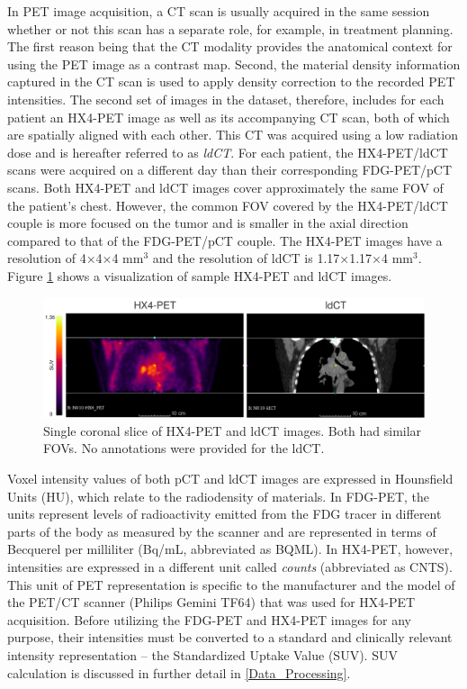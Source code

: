 In PET image acquisition, a CT scan is usually acquired in the same session whether or not this scan has a separate role, for example, in treatment planning. The first reason being that the CT modality provides the anatomical context for using the PET image as a contrast map. Second, the material density information captured in the CT scan is used to apply density correction to the recorded PET intensities. The second set of images in the dataset, therefore, includes for each patient an HX4-PET image as well as its accompanying CT scan, both of which are spatially aligned with each other. This CT was acquired using a low radiation dose and is hereafter referred to as \textit{ldCT}. For each patient, the HX4-PET/ldCT scans were acquired on a different day than their corresponding FDG-PET/pCT scans. Both HX4-PET and ldCT images cover approximately the same FOV of the patient's chest. However, the common FOV covered by the HX4-PET/ldCT couple is more focused on the tumor and is smaller in the axial direction compared to that of the FDG-PET/pCT couple. The HX4-PET images have a resolution of 4$\times$4$\times$4 mm$^3$ and the resolution of ldCT is 1.17$\times$1.17$\times$4 mm$^3$. Figure \ref{fig:original_hx4pet_ldct} shows a visualization of sample HX4-PET and ldCT images.

\begin{figure}[h!]
    \centering
    \includegraphics[width=\linewidth]{figures/Data/original/N010-HX4_PET_ldCT.png}
    \caption{Single coronal slice of HX4-PET and ldCT images. Both had similar FOVs. No annotations were provided for the ldCT.}
    \label{fig:original_hx4pet_ldct}
\end{figure}

Voxel intensity values of both pCT and ldCT images are expressed in Hounsfield Units (HU), which relate to the radiodensity of materials. In FDG-PET, the units represent levels of radioactivity emitted from the FDG tracer in different parts of the body as measured by the scanner and are represented in terms of Becquerel per milliliter (Bq/mL, abbreviated as BQML). In HX4-PET, however, intensities are expressed in a different unit called \textit{counts} (abbreviated as CNTS). This unit of PET representation is specific to the manufacturer and the model of the PET/CT scanner (Philips Gemini TF64) that was used for HX4-PET acquisition. Before utilizing the FDG-PET and HX4-PET images for any purpose, their intensities must be converted to a standard and clinically relevant intensity representation -- the Standardized Uptake Value (SUV). SUV calculation is discussed in further detail in \ref{Data_Processing}.


